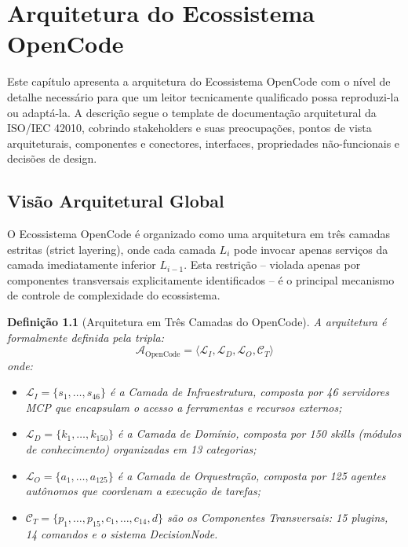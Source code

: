 \documentclass[12pt,a4paper,sumario=tradicional,openany]{abntex2}
\newtheorem{definition}{Definição}[chapter]
\begin{document}
\chapter{Arquitetura do Ecossistema OpenCode}

Este capítulo apresenta a arquitetura do Ecossistema OpenCode com o nível de detalhe necessário para que um leitor tecnicamente qualificado possa reproduzi-la ou adaptá-la. A descrição segue o template de documentação arquitetural da ISO/IEC 42010, cobrindo stakeholders e suas preocupações, pontos de vista arquiteturais, componentes e conectores, interfaces, propriedades não-funcionais e decisões de design.

\section{Visão Arquitetural Global}

O Ecossistema OpenCode é organizado como uma arquitetura em três camadas estritas (strict layering), onde cada camada $L_i$ pode invocar apenas serviços da camada imediatamente inferior $L_{i-1}$. Esta restrição -- violada apenas por componentes transversais explicitamente identificados -- é o principal mecanismo de controle de complexidade do ecossistema.

\begin{definition}[Arquitetura em Três Camadas do OpenCode]
A arquitetura é formalmente definida pela tripla:
\begin{equation}
\mathcal{A}_{\text{OpenCode}} = \langle \mathcal{L}_I, \mathcal{L}_D, \mathcal{L}_O, \mathcal{C}_T \rangle
\end{equation}
onde:
\begin{itemize}
    \item $\mathcal{L}_I = \{s_1, \ldots, s_{46}\}$ é a Camada de Infraestrutura, composta por 46 servidores MCP que encapsulam o acesso a ferramentas e recursos externos;
    \item $\mathcal{L}_D = \{k_1, \ldots, k_{150}\}$ é a Camada de Domínio, composta por 150 skills (módulos de conhecimento) organizadas em 13 categorias;
    \item $\mathcal{L}_O = \{a_1, \ldots, a_{125}\}$ é a Camada de Orquestração, composta por 125 agentes autônomos que coordenam a execução de tarefas;
    \item $\mathcal{C}_T = \{p_1, \ldots, p_{15}, c_1, \ldots, c_{14}, d\}$ são os Componentes Transversais: 15 plugins, 14 comandos e o sistema DecisionNode.
\end{itemize}
\end{definition}
\end{document}
